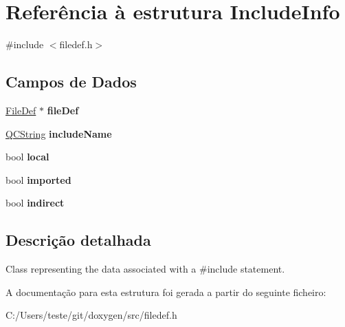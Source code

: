 \hypertarget{struct_include_info}{\section{Referência à estrutura Include\-Info}
\label{struct_include_info}
}


{\ttfamily \#include $<$filedef.\-h$>$}

\subsection*{Campos de Dados}
\begin{DoxyCompactItemize}
\item 
\hypertarget{struct_include_info_a2e1ae363ea84baa4340319bb5a163f25}{\hyperlink{class_file_def}{File\-Def} $\ast$ {\bfseries file\-Def}}\label{struct_include_info_a2e1ae363ea84baa4340319bb5a163f25}

\item 
\hypertarget{struct_include_info_ab79d462c125865b06a1d6f9ee3e66260}{\hyperlink{class_q_c_string}{Q\-C\-String} {\bfseries include\-Name}}\label{struct_include_info_ab79d462c125865b06a1d6f9ee3e66260}

\item 
\hypertarget{struct_include_info_ac7dea507466f9f8d216a8c8db5f445fd}{bool {\bfseries local}}\label{struct_include_info_ac7dea507466f9f8d216a8c8db5f445fd}

\item 
\hypertarget{struct_include_info_a205acc7b1107b239562e9ee6e6e64e2e}{bool {\bfseries imported}}\label{struct_include_info_a205acc7b1107b239562e9ee6e6e64e2e}

\item 
\hypertarget{struct_include_info_a9a5250a0c844eba2b009bc5e35978614}{bool {\bfseries indirect}}\label{struct_include_info_a9a5250a0c844eba2b009bc5e35978614}

\end{DoxyCompactItemize}


\subsection{Descrição detalhada}
Class representing the data associated with a \#include statement. 

A documentação para esta estrutura foi gerada a partir do seguinte ficheiro\-:\begin{DoxyCompactItemize}
\item 
C\-:/\-Users/teste/git/doxygen/src/filedef.\-h\end{DoxyCompactItemize}
